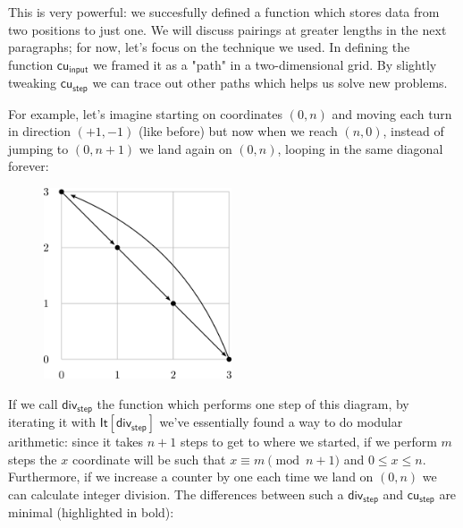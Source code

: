 \documentclass[oneside]{book}
\theoremstyle{definition}
\theoremstyle{remark}
\theoremstyle{plain}
\newcommand{\rppIt}{\mathsf{It}}
\newcommand{\rppcui}{\mathsf{cu_{input}}}
\newcommand{\rppcustep}{\mathsf{cu_{step}}}
\newcommand{\rppdivstep}{\mathsf{div_{step}}}
\begin{document}
This is very powerful: we succesfully defined a function which stores data from two positions to just one.
We will discuss pairings at greater lengths in the next paragraphs; for now, let's focus on the technique we used.
In defining the function $\rppcui$ we framed it as a "path" in a two-dimensional grid.
By slightly tweaking $\rppcustep$ we can trace out other paths which helps us solve new problems.

For example, let's imagine starting on coordinates $(0,n)$ and moving each turn in direction $(+1,-1)$ (like before)
but now when we reach $(n,0)$, instead of jumping to $(0,n+1)$ we land again on $(0,n)$, looping in the same diagonal forever:

\begin{figure}[H]
  \centering
  \includegraphics[width=15em]{Immagini/div.png}
\end{figure}

If we call $\rppdivstep$ the function which performs one step of this diagram, by iterating it with $\rppIt[\rppdivstep]$
we've essentially found a way to do modular arithmetic: since it takes $n+1$ steps to get to where we started,
if we perform $m$ steps the $x$ coordinate will be such that $x \equiv m \pmod{n+1}$ and $0 \le x \le n$.
Furthermore, if we increase a counter by one each time we land on $(0,n)$ we can calculate integer division.
The differences between such a $\rppdivstep$ and $\rppcustep$ are minimal (highlighted in bold):
\end{document}
